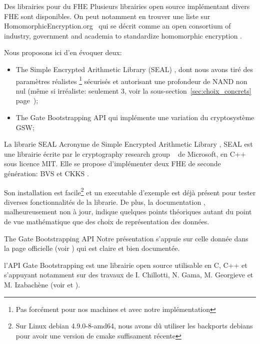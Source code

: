 \begin{section}{Des librairies pour du FHE}
Plusieurs librairies open source implémentant divers FHE sont disponibles. 
On peut notamment en trouver une liste sur HomomorphicEncryption.org~\cite{homencrypt.org}
qui se décrit comme \og an open consortium of industry, government and academia to 
standardize homomorphic encryption \fg.

Nous proposons ici d'en évoquer deux:
\begin{itemize}
\item The Simple Encrypted Arithmetic Library (SEAL) \cite{seal}, dont nous avons tiré des paramètres  
\og réalistes \fg\footnote{Pas forcément pour nos machines et avec notre implémentation}
sécurisés et autorisant une profondeur de NAND non nul (même si irréaliste: seulement 3, voir la 
sous-section~\ref{sec:choix_concrets} page~\pageref{sec:choix_concrets});
\item The Gate Bootstrapping API \cite{TFHE} qui implémente une variation du cryptosystème GSW;
\end{itemize}

\begin{subsection}{La librarie SEAL}
Acronyme de \og Simple Encrypted Arithmetic Library \fg, SEAL \cite{seal}
est une librairie écrite par le \og cryptography research group \fg~ de Microsoft, en C++ sous 
licence MIT. Elle se propose d'implémenter deux FHE de seconde génération: 
BVS \cite{EPRINT:FanVer12} et CKKS \cite{AC:CKKS17}.

Son installation est facile\footnote{Sur Linux debian 4.9.0-8-amd64, nous avons dû
utiliser les backports debians pour avoir une version de cmake suffisament récente}
et un executable d'exemple est déjà présent pour tester diverses fonctionnalités de la librarie. De plus, la
documentation \cite{seal_manual_231}, malheureusement non à jour, indique quelques points théoriques autant du point de
vue mathématique que des choix de représentation des données.
\end{subsection}

\begin{subsection}{The Gate Bootstrapping API}
Notre présentation s'appuie sur celle donnée dans la page officielle (voir \cite{TFHE})
 qui est claire et bien documentée.

l'API Gate Bootstrapping est une librairie open source utilisable en C, C++ et 
s'appuyant notamment sur des travaux de I. Chillotti, N. Gama, M. Georgieve et M. Izabachène 
(voir \cite{cryptoeprint:2017:430} et  \cite{cryptoeprint:2016:870}). 


\end{subsection}
\end{section}
